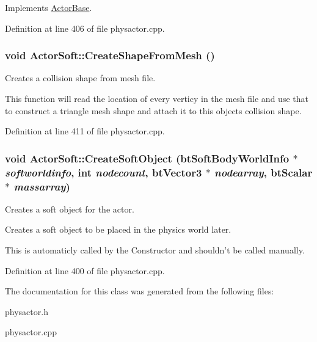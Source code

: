 Implements \hyperlink{classActorBase_a8c5401ae316ad2fbc1279016cef4c9f6}{ActorBase}.



Definition at line 406 of file physactor.cpp.

\hypertarget{classActorSoft_a55ac461f317aed2b812f07eb384b2a6d}{
\subsubsection[{CreateShapeFromMesh}]{\setlength{\rightskip}{0pt plus 5cm}void ActorSoft::CreateShapeFromMesh ()}}
\label{d5/da4/classActorSoft_a55ac461f317aed2b812f07eb384b2a6d}


Creates a collision shape from mesh file. 

This function will read the location of every verticy in the mesh file and use that to construct a triangle mesh shape and attach it to this objects collision shape. 

Definition at line 411 of file physactor.cpp.

\hypertarget{classActorSoft_a01a570c728d6cb96d1a40003d6b17e22}{
\subsubsection[{CreateSoftObject}]{\setlength{\rightskip}{0pt plus 5cm}void ActorSoft::CreateSoftObject (btSoftBodyWorldInfo $\ast$ {\em softworldinfo}, \/  int {\em nodecount}, \/  btVector3 $\ast$ {\em nodearray}, \/  btScalar $\ast$ {\em massarray})}}
\label{d5/da4/classActorSoft_a01a570c728d6cb96d1a40003d6b17e22}


Creates a soft object for the actor. 

Creates a soft object to be placed in the physics world later. \par
 This is automaticly called by the Constructor and shouldn't be called manually. 

Definition at line 400 of file physactor.cpp.



The documentation for this class was generated from the following files:\begin{DoxyCompactItemize}
\item 
physactor.h\item 
physactor.cpp\end{DoxyCompactItemize}
